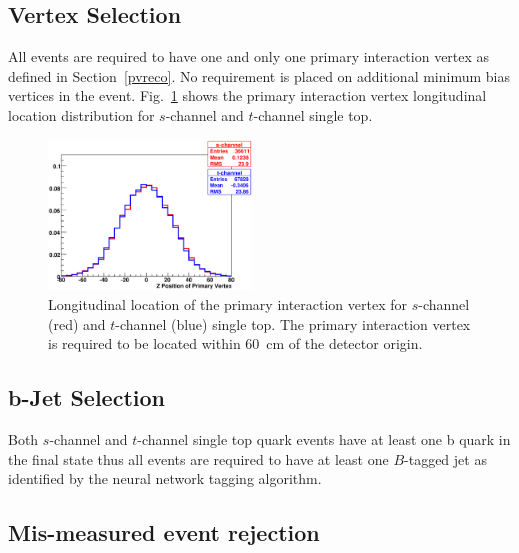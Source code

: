 \subsection{Vertex Selection}
\label{vertexselection}

All events are required to have one and only one primary interaction vertex as defined in Section~\ref{pvreco}. No requirement is placed on additional minimum bias vertices in the event. Fig.~\ref{stpv} shows the primary interaction vertex longitudinal location distribution for $s$-channel and $t$-channel single top.

\begin{figure}[!h!tbp]
\begin{center}
\includegraphics[width=0.48\textwidth]{eps/Analysis/PVz.eps}
\end{center}
\vspace{-0.1in}
\caption{Longitudinal location of the primary interaction vertex for $s$-channel (red) and $t$-channel (blue) single top. The primary interaction vertex is required to be located within 60~cm of the detector origin.}
\label{stpv}
\end{figure}

\subsection{b-Jet Selection}
\label{bjetselection}

Both $s$-channel and $t$-channel single top quark events have at least one b quark in the final state thus all events are required to have at least one $B$-tagged jet as identified by the neural network tagging algorithm.

\subsection{Mis-measured event rejection}
\label{misidselection}

